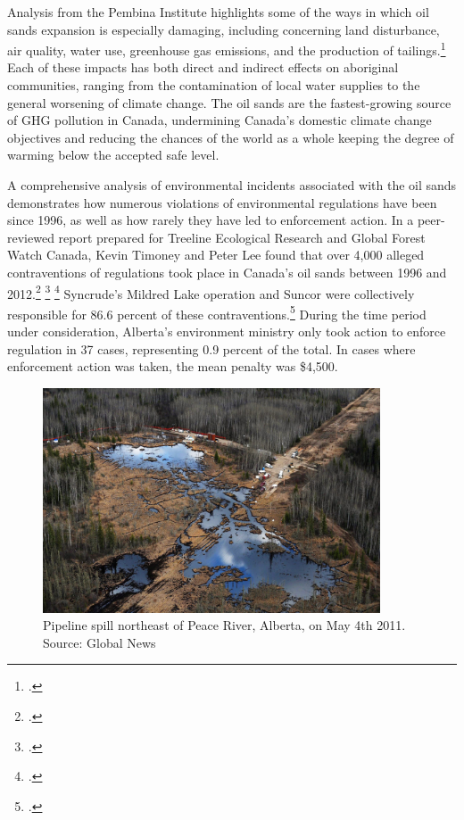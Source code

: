 Analysis from the Pembina Institute highlights some of the ways in which oil sands expansion is especially damaging, including concerning land disturbance, air quality, water use, greenhouse gas emissions, and the production of tailings.\footcite[][p. 1]{PembinaOilsandsExpansion}
Each of these impacts has both direct and indirect effects on aboriginal communities, ranging from the contamination of local water supplies to the general worsening of climate change.
The oil sands are the fastest-growing source of GHG pollution in Canada, undermining Canada's domestic climate change objectives and reducing the chances of the world as a whole keeping the degree of warming below the accepted safe level.



A comprehensive analysis of environmental incidents associated with the oil sands demonstrates how numerous violations of environmental regulations have been since 1996, as well as how rarely they have led to enforcement action.
In a peer-reviewed report prepared for Treeline Ecological Research and Global Forest Watch Canada, Kevin Timoney and Peter Lee found that over 4,000 alleged contraventions of regulations took place in Canada's oil sands between 1996 and 2012.\footcite[][p. 8]{OnePercentReport} \footcite[See also: ][]{GlobalFewerOnePercent} \footcite[See also: ][]{FinPoOnePercent}
Syncrude's Mildred Lake operation and Suncor were collectively responsible for 86.6 percent of these contraventions.\footcite[][p. 8]{OnePercentReport}
During the time period under consideration, Alberta's environment ministry only took action to enforce regulation in 37 cases, representing 0.9 percent of the total.
In cases where enforcement action was taken, the mean penalty was \$4,500.



\begin{figure}[h]
\includegraphics[width=100mm]{s3-pipeline-spill.png}
\centering
\caption{Pipeline spill northeast of Peace River, Alberta, on May 4th 2011. Source: Global News}
\label{fig:s3-pipeline-spill}
\end{figure}



